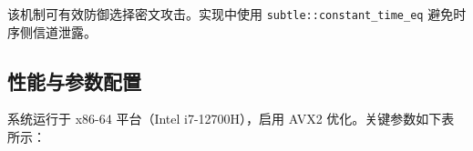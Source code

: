 该机制可有效防御选择密文攻击。实现中使用 \texttt{subtle::constant\_time\_eq} 避免时序侧信道泄露。







\subsection{性能与参数配置}
系统运行于 x86-64 平台（Intel i7-12700H），启用 AVX2 优化。关键参数如下表所示：

